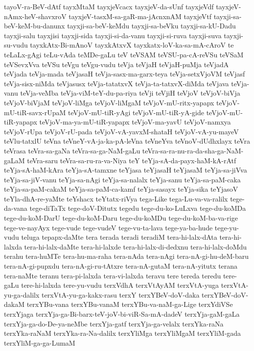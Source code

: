 {tayoV-ra-BeV-dAtf
tayxMtaM
tayxjeVcacx
tayxjeV-da-sUnf
tayxjeVdf
tayxjeV-nAmx-heV-shavxroV
tayxjeV-tasxM-sa-gaR-ma-jAcnxnAM
tayxjeVtf
tayxji-sa-beV-keM-bu-danunx
tayxji-sa-beV-keMdu
tayxji-sa-beVku
tayxji-sa-kU-Dadu
tayxji-salu
tayxjisi
tayxji-sida
tayxji-si-da-vanu
tayxji-si-ruva
tayxji-suva
tayxji-su-vudu
tayxkAtx-Bi-mAnoV
tayxkAtxvX
tayxkatx-loV-ka-sa-mA-cAroV
te
teLaLx-gAgi
teLu-vAda
teMDe-gaLu
teV
teVSAM
teVSU-pa-cA-reVSu
teVSaM
teVSevxVva
teVSu
teVgu
teVgu-vudu
teVja
teVjaH
teVjaH-puMja
teVjadA
teVjada
teVja-mada
teVjasaH
teVja-sasx-ma-garx-teya
teVja-setxVjoVM
teVjasf
teVja-sisx-niMda
teVjasusx
teVja-tatatxvX
teVja-ta-tatxvX-diMda
teVjava
teVja-vanu
teVja-veMba
teVja-viM-teY-du-pa-riya
teVji
teVjiH
teVjoV
teVjoV-biVja
teVjoV-biVjaM
teVjoV-liMga
teVjoV-liMgaM
teVjoV-mU-ritx-yapapx
teVjoV-mU-tiR-savx-rUpaM
teVjoV-mU-tiR-yAgi
teVjoV-mU-tiR-yA-gide
teVjoV-mU-tiR-yapapx
teVjoV-ma-ya-mU-tiR-yapapx
teVjoV-ma-yavU
teVjoV-namxya
teVjoV-rUpa
teVjoV-rU-pada
teVjoV-vA-yavxM-shataH
teVjoV-vA-yu-mayeV
teVlu-tatxlU
teVna
teVneY-vA-ja-ka-pA-leVna
teVneYva
teVnoV-dUdhxlayx
teVra
teVrasa
teVra-sa-gaNa
teVra-sa-ga-NaM-gaLu
teVra-sa-ra-nu-ra-da-sha-ga-NaM-gaLaM
teVra-saru
teVra-sa-ru-ra-va-Niya
teY
teYja-sA-da-payx-haM-kA-rAtf
teYja-sA-haM-kAra
teYja-sA-tamxne
teYjasa
teYjasaH
teYjasaM
teYja-sa-jiVva
teYja-sa-jiV-vanu
teYja-sa-nAgi
teYja-sa-nalalx
teYja-sanu
teYja-sa-paM-caka
teYja-sa-paM-cakaM
teYja-sa-paM-ca-kamf
teYja-sasayx
teYja-sika
teYjasoV
teYla-dhA-re-yaMte
teYshacx
teYtatx-riVya
tega-Like
tega-Lu-va-va-ralilx
tege-da-vana
tege-diTaTx
tege-doV-Ditutx
tegedu
tege-du-ko-LuLxva
tege-du-koMDa
tege-du-koM-DarU
tege-du-koM-Daru
tege-du-koMDu
tege-du-koM-ba-va-rige
tege-ve-nayAyx
tege-vude
tege-vudeV
tege-vu-ta-lava
tege-ya-ba-hude
tege-yu-vudu
teluga
tepapx-daMte
tera
terada
teradi
teradiM
tera-hi-lalx-dAta
tera-hi-lalxda
tera-hi-lalx-daMte
tera-hi-lalxde
tera-hi-lalx-di-dedxnu
tera-hi-lalx-doMdu
terahu
tera-huMTe
tera-hu-ma-raha
tera-nAda
tera-nAgi
tera-nA-gi-hu-deM-baru
tera-nA-gi-pupxdu
tera-nA-gi-ru-tAtxre
tera-nA-gutaM
tera-nA-yitutx
terana
tera-naMte
teranu
tera-pi-lalxda
tera-vi-lalxda
teravu
tere
tereda
teredu
tere-gaLu
tere-hi-lalxda
tere-yu-vudu
terxVdhA
terxVtAyAM
terxVtA-yuga
terxVtA-yu-ga-dalilx
terxVtA-yu-ga-kakx-rasu
terxY
terxYBeV-doV-daka
terxYBeV-doV-dakaM
terxYBu-vana
terxYBu-vanaM
terxYBu-va-naM-ga-Lige
terxYdiVSe
terxYjaga
terxYja-ga-Bi-barx-teV-joV-bi-viR-Sa-mA-dadeV
terxYja-gaM-gaLa
terxYja-ga-do-De-ya-neMbe
terxYja-gatf
terxYja-ga-velalx
terxYka-raNa
terxYka-raNaM
terxYka-ra-Na-dalilx
terxYliMga
terxYliMgaM
terxYliM-gada
terxYliM-ga-ga-LumaM
}
